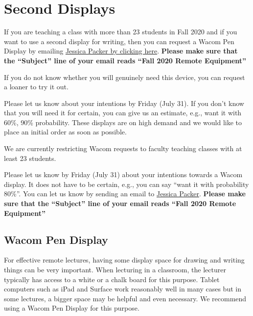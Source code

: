 \chapter{Second Displays}
\label{ch:displays}


\begin{gram}
\label{grm:displays::preamble}
If you are teaching a class with more than 23 students in Fall 2020
and if you want to use a second display for writing, then you can
request a Wacom Pen Display by emailing 
%
\href{mailto:jpacker@andrew.cmu.edu?subject=Fall 2020 Remote
  Equipment&body=Hi Jessica,} {Jessica Packer by clicking here}.
%
\textbf{Please make sure that the ``Subject'' line of your email reads ``Fall 2020 Remote Equipment''}

If you do not know whether you will genuinely need this device, you can request a loaner to try it out.
%

Please let us know about your intentions by Friday (July 31).  If you don't know that you will need it for certain, you can give us an estimate, e.g., want it with 60\%, 90\% probability.  
%
These displays are on high demand and we would like to place an initial order as soon as possible.

\end{gram}

\begin{note}
We are currently restricting Wacom requests to faculty teaching classes with at least 23 students. 
%
\end{note}

\begin{important}[Deadline]
Please let us know by Friday (July 31) about your intentions towards a Wacom display.  It does not have to be certain, e.g., you can say “want it with probability 80\%”.   
%
You can let us know by sending an email to
\href{mailto:jpacker@andrew.cmu.edu?subject=Fall 2020 Remote
  Equipment&body=Hi Jessica,} {Jessica Packer}.
%
\textbf{Please make sure that the ``Subject'' line of your email reads ``Fall 2020 Remote Equipment''}
\end{important}

\section{Wacom Pen Display}
\label{ch:displays::wacom}

For effective remote lectures, having some display space for drawing and writing things can be very important.  When lecturing in a classroom, the lecturer typically has access to a white or a chalk  board for this purpose.  
%
Tablet computers such as iPad and Surface work reasonably well in many cases but in some lectures, a bigger space may be helpful and even necessary. 
%
We recommend using a Wacom Pen Display for this purpose.

